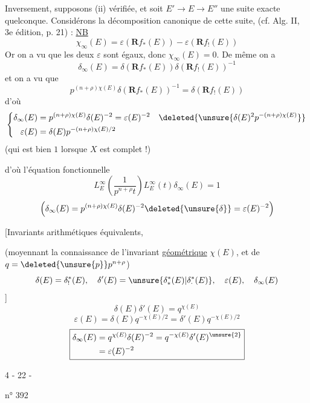 Inversement, supposons (ii) vérifiée, et soit $E'\longrightarrow E\longrightarrow E''$ une suite exacte quelconque. Considérons la décomposition canonique de cette suite, (cf. Alg. II, 3e édition, p. 21) :
\uline{NB}
\[\chi_\infty(E)=\varepsilon(\mathbf R f_*(E))-\varepsilon(\mathbf R f_!(E))\]
Or on a vu que les deux $\varepsilon$ sont égaux, donc $\chi_\infty(E)=0$. De même on a
\[\delta_\infty(E)=\delta(\mathbf R f_*(E))\delta(\mathbf R f_!(E))^{-1}\]
et on a vu que
\[p^{(n+\rho)\chi(E)}\delta(\mathbf R f_*(E))^{-1}=\delta(\mathbf R f_!(E))\]
d'où
\[\left\{\begin{aligned}
\delta_\infty(E)&=p^{(n+\rho)\chi(E)}\delta(E)^{-2}=\varepsilon(E)^{-2}\quad\deleted{\unsure{\delta(E)^2p^{-(n+\rho)\chi(E)}}}\\
\varepsilon(E)&=\delta(E)p^{-(n+\rho)\chi(E)/2}
\end{aligned}\right.\]
(qui est bien $1$ lorsque $X$ est complet !)

d'où l'équation fonctionnelle
\[\boxed{L_E^\infty\left(\frac1{p^{n+\rho}t}\right)L_E^\infty(t)\delta_\infty(E)=1}\]
\[\left(\delta_\infty(E)=p^{(n+\rho)\chi(E)}\delta(E)^{-2}\deleted{\unsure{\delta}}=\varepsilon(E)^{-2}\right)\]

[Invariants arithmétiques équivalents,

(moyennant la connaissance de l'invariant \uline{géométrique} $\chi(E)$, et de $q=\deleted{\unsure{p}}p^{n+\rho}$)
\[\delta(E)=\delta_!^*(E),\quad\delta'(E)=\unsure{\delta_*^*(E)|\delta_\cdot^*(E)},\quad\varepsilon(E),\quad\delta_\infty(E)\]
]
\[\boxed{\delta(E)\delta'(E)=q^{\chi(E)}}\]
\[\boxed{\varepsilon(E)=\delta(E)q^{-\chi(E)/2}=\delta'(E)q^{-\chi(E)/2}}\]
\[\boxed{\begin{aligned}
\delta_\infty(E)&=q^{\chi(E)}\delta(E)^{-2}=q^{-\chi(E)}\delta'(E)^{\unsure{2}}\\
&=\varepsilon(E)^{-2}
\end{aligned}}\]
\begin{center}4 - 22 -\end{center}
\hfill n° 392

